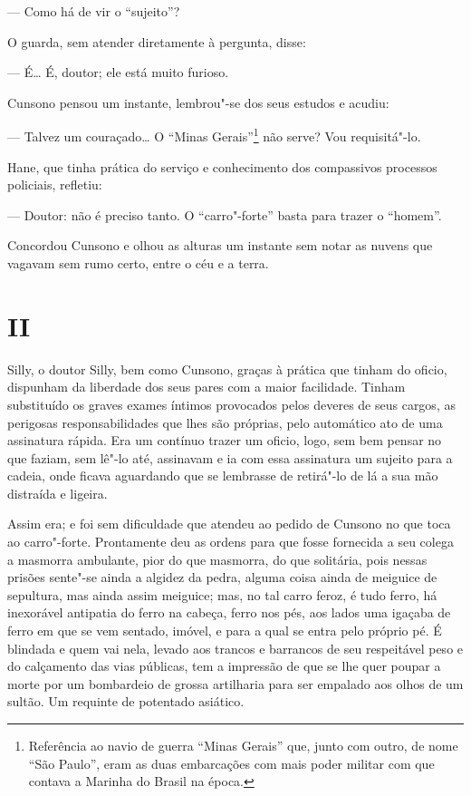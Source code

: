 --- Como há de vir o ``sujeito''?

O guarda, sem atender diretamente à pergunta, disse:

--- É\ldots{} É, doutor; ele está muito furioso.

Cunsono pensou um instante, lembrou"-se dos seus estudos e acudiu:

--- Talvez um couraçado\ldots{} O ``Minas Gerais''\footnote{Referência ao navio
  de guerra ``Minas Gerais'' que, junto com outro, de nome ``São
  Paulo'', eram as duas embarcações com mais poder militar com que
  contava a Marinha do Brasil na época.} não serve? Vou requisitá"-lo.

Hane, que tinha prática do serviço e conhecimento dos compassivos
processos policiais, refletiu:

--- Doutor: não é preciso tanto. O ``carro"-forte'' basta para trazer o
``homem''.

Concordou Cunsono e olhou as alturas um instante sem notar as nuvens que
vagavam sem rumo certo, entre o céu e a terra.

\section{II}

Silly, o doutor Silly, bem como Cunsono, graças à prática que tinham do
oficio, dispunham da liberdade dos seus pares com a maior facilidade.
Tinham substituído os graves exames íntimos provocados pelos deveres de
seus cargos, as perigosas responsabilidades que lhes são próprias, pelo
automático ato de uma assinatura rápida. Era um contínuo trazer um
oficio, logo, sem bem pensar no que faziam, sem lê"-lo até, assinavam e
ia com essa assinatura um sujeito para a cadeia, onde ficava aguardando
que se lembrasse de retirá"-lo de lá a sua mão distraída e ligeira.

Assim era; e foi sem dificuldade que atendeu ao pedido de Cunsono no que
toca ao carro"-forte. Prontamente deu as ordens para que fosse fornecida
a seu colega a masmorra ambulante, pior do que masmorra, do que
solitária, pois nessas prisões sente"-se ainda a algidez da pedra, alguma
coisa ainda de meiguice de sepultura, mas ainda assim meiguice; mas, no
tal carro feroz, é tudo ferro, há inexorável antipatia do ferro na
cabeça, ferro nos pés, aos lados uma igaçaba de ferro em que se vem
sentado, imóvel, e para a qual se entra pelo próprio pé. É blindada e
quem vai nela, levado aos trancos e barrancos de seu respeitável peso e
do calçamento das vias públicas, tem a impressão de que se lhe quer
poupar a morte por um bombardeio de grossa artilharia para ser empalado
aos olhos de um sultão. Um requinte de potentado asiático.

